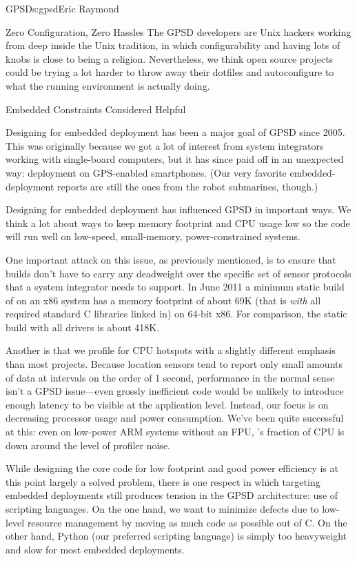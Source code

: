 \begin{aosachapter}{GPSD}{s:gpsd}{Eric Raymond}
\begin{aosasect1}{Zero Configuration, Zero Hassles}
The GPSD developers are Unix hackers working from deep inside the
Unix tradition, in which configurability and having lots of knobs
is close to being a religion.  Nevertheless, we think open source
projects could be trying a lot harder to throw away their dotfiles
and autoconfigure to what the running environment is actually doing.

\end{aosasect1}

\begin{aosasect1}{Embedded Constraints Considered Helpful}

Designing for embedded deployment has been a major goal of GPSD since
2005. This was originally because we got a lot of interest from system
integrators working with single-board computers, but it has since paid
off in an unexpected way: deployment on GPS-enabled smartphones. (Our
very favorite embedded-deployment reports are still the ones from the
robot submarines, though.)

Designing for embedded deployment has influenced GPSD in important
ways.  We think a lot about ways to keep memory footprint and CPU
usage low so the code will run well on low-speed, small-memory,
power-constrained systems.

One important attack on this issue, as previously mentioned, is to
ensure that  builds don't have to carry any deadweight over
the specific set of sensor protocols that a system integrator needs to
support. In June 2011 a minimum static build of  on an x86
system has a memory footprint of about 69K (that is \emph{with} all
required standard C libraries linked in) on 64-bit x86. For
comparison, the static build with all drivers is about 418K.

Another is that we profile for CPU hotspots with a slightly different
emphasis than most projects. Because location sensors tend to report
only small amounts of data at intervals on the order of 1 second,
performance in the normal sense isn't a GPSD issue---even grossly
inefficient code would be unlikely to introduce enough latency to be
visible at the application level.  Instead, our focus is on decreasing
processor usage and power consumption.  We've been quite successful at
this: even on low-power ARM systems without an FPU, 's
fraction of CPU is down around the level of profiler noise.

While designing the core code for low footprint and good power
efficiency is at this point largely a solved problem, there is one
respect in which targeting embedded deployments still produces tension
in the GPSD architecture: use of scripting languages. On the one hand,
we want to minimize defects due to low-level resource management by
moving as much code as possible out of C.  On the other hand, Python
(our preferred scripting language) is simply too heavyweight and slow
for most embedded deployments.


\end{aosasect1}
\end{aosachapter}
